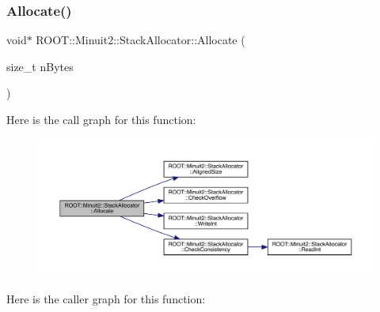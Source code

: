 \subsubsection{\texorpdfstring{Allocate()}{Allocate()}\hspace{0.1cm}{\footnotesize\ttfamily [2/2]}}
{\footnotesize\ttfamily void$\ast$ R\+O\+O\+T\+::\+Minuit2\+::\+Stack\+Allocator\+::\+Allocate (\begin{DoxyParamCaption}\item[{size\+\_\+t}]{n\+Bytes }\end{DoxyParamCaption})\hspace{0.3cm}{\ttfamily [inline]}}

Here is the call graph for this function\+:
\nopagebreak
\begin{figure}[H]
\begin{center}
\leavevmode
\includegraphics[width=350pt]{d3/d1e/classROOT_1_1Minuit2_1_1StackAllocator_a1fb4d1744055446776080af229679e03_cgraph}
\end{center}
\end{figure}
Here is the caller graph for this function\+:\nopagebreak
